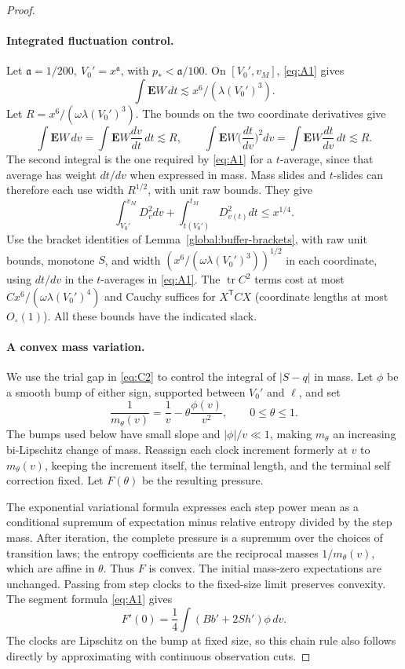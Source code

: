 \begin{proof}
\paragraph{Integrated fluctuation control.}
Let \(\mathfrak a=1/200,\ V_0'=x^{\mathfrak a}\), with \(p_*<\mathfrak a/100\). On \([V_0',v_M]\), \eqref{eq:A1} gives
\begin{equation*}
\int \mathbf E W\,dt\lesssim x^6/(\lambda (V_0')^3).
\end{equation*}
Let $R=x^6/(\omega\lambda(V_0')^3)$.  The bounds on the two
coordinate derivatives give
\[
 \int\mathbf EW\,dv
   =\int\mathbf EW\frac{dv}{dt}\,dt\lesssim R,
 \qquad
 \int\mathbf EW\Big(\frac{dt}{dv}\Big)^2dv
   =\int\mathbf EW\frac{dt}{dv}\,dt\lesssim R.
\]
The second integral is the one required by \eqref{eq:A1} for a
$t$-average, since that average has weight $dt/dv$ when expressed in
mass.  Mass slides and $t$-slides can therefore each use width
$R^{1/2}$, with unit raw bounds.  They give
\begin{equation}
\int_{V_0'}^{v_M} D_v^2 dv+
       \int_{t(V_0')}^{t_M} D_{v(t)}^2 dt\le x^{1/4}.               \tag{D12}\label{eq:D12}
\end{equation}
Use the bracket identities of Lemma~\ref{global:buffer-brackets}, with raw unit bounds, monotone \(S\), and width \((x^6/(\omega\lambda (V_0')^3))^{1/2}\) in each coordinate, using \(dt/dv\) in the \(t\)-averages in \eqref{eq:A1}. The \(\operatorname{tr} C^2\) terms cost at most \(C x^6/(\omega\lambda(V_0')^4)\) and Cauchy suffices for \(X^{\mathsf T}CX\) (coordinate lengths at most \(O_\circ(1)\)). All these bounds have the indicated slack.

\paragraph{A convex mass variation.}
We use the trial gap in \eqref{eq:C2} to control the integral
of $|S-q|$ in mass.  Let $\phi$ be a smooth bump of either sign,
supported between $V_0'$ and $\ell$, and set
\[
 \frac1{m_\theta(v)}=\frac1v-\theta\frac{\phi(v)}{v^2},
       \qquad 0\le\theta\le1.
\]
The bumps used below have small slope and $|\phi|/v\ll1$, making
$m_\theta$ an increasing bi-Lipschitz change of mass.  Reassign each
clock increment formerly at $v$ to $m_\theta(v)$, keeping the increment
itself, the terminal length, and the terminal self correction fixed.
Let $F(\theta)$ be the resulting pressure.

The exponential variational formula expresses each step power mean
as a conditional supremum of expectation minus relative entropy
divided by the step mass.  After iteration, the complete pressure is
a supremum over the choices of transition laws; the entropy
coefficients are the reciprocal masses $1/m_\theta(v)$, which are
affine in $\theta$.  Thus $F$ is convex.  The initial mass-zero
expectations are unchanged.  Passing from step clocks to the fixed-size
limit preserves convexity.  The segment formula \eqref{eq:A1} gives
\[
 F'(0)=\frac14\int(Bb'+2Sh')\phi\,dv.
\]
The clocks are Lipschitz on the bump at fixed size, so this chain rule
also follows directly by approximating with continuous observation cuts.


\end{proof}
